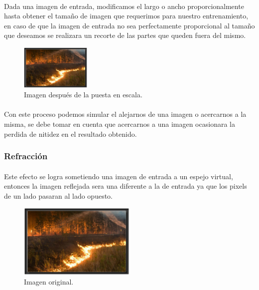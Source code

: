 \paragraph{} Dada una imagen de entrada, modificamos el largo o ancho proporcionalmente hasta obtener el tamaño de imagen que requerimos para nuestro entrenamiento, en caso de que la imagen de entrada no sea perfectamente proporcional al tamaño que deseamos se realizara un recorte de las partes que queden fuera del mismo.

\begin{figure}[h!]
\centering
\includegraphics[width=0.3\textwidth , frame]{./imagenes/tratamiento/full_image}
\caption{Imagen después de la puesta en escala.}
\label{fig:coleccion}
\end{figure}

\paragraph{} Con este proceso podemos simular el alejarnos de una imagen o acercarnos a la misma, se debe tomar en cuenta que acercarnos a una imagen ocasionara la perdida de nitidez en el resultado obtenido.

\subsubsection{Refracción }

\paragraph{} Este efecto se logra sometiendo una imagen de entrada a un espejo virtual, entonces la imagen reflejada sera una diferente a la de entrada ya que los pixels de un lado pasaran al lado opuesto.

\begin{figure}[h!]
\centering
\includegraphics[width=0.5\textwidth , frame]{./imagenes/tratamiento/full_image}
\caption{Imagen original.}
\label{fig:coleccion}
\end{figure}

